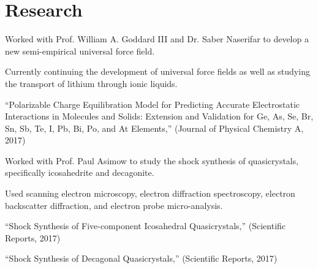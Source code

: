 \documentclass[letterpaper]{deedy-resume} %
\begin{document}
\begin{minipage}[t]{0.58\textwidth}







\section{Research}


\begin{tightitemize}
\item Worked with Prof. William A. Goddard III and Dr. Saber Naserifar to develop a new semi-empirical universal force field. 
\item Currently continuing the development of universal force fields as well as studying the transport of lithium through ionic liquids.
\item ``Polarizable Charge Equilibration Model for Predicting Accurate Electrostatic Interactions in Molecules and Solids: Extension and Validation for Ge, As, Se, Br, Sn, Sb, Te, I, Pb, Bi, Po, and At Elements,'' (Journal of Physical Chemistry A, 2017)
\end{tightitemize}



\begin{tightitemize}
\item Worked with Prof. Paul Asimow to study the shock synthesis of quasicrystals, specifically icosahedrite and decagonite.
\item Used scanning electron microscopy, electron diffraction spectroscopy, electron backscatter diffraction, and electron probe micro-analysis.
\item ``Shock Synthesis of Five-component Icosahedral Quasicrystals,'' (Scientific Reports, 2017)
\item ``Shock Synthesis of Decagonal Quasicrystals,'' (Scientific Reports, 2017)
\end{tightitemize}


\end{minipage}
\end{document}

